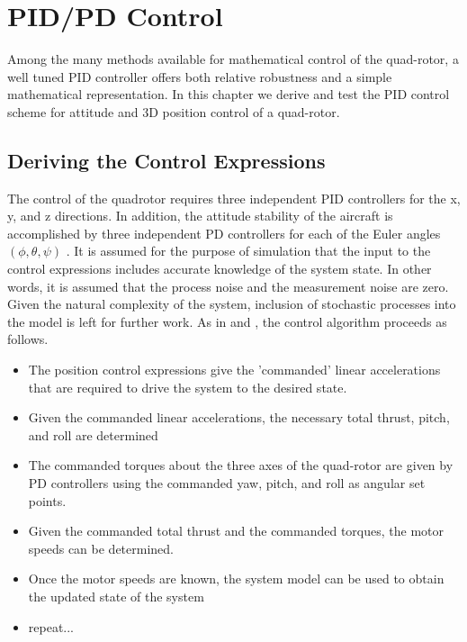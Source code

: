 
\chapter{PID/PD Control} %

\label{Chapter6} %


Among the many methods available for mathematical control of the quad-rotor, a well tuned PID controller offers both relative robustness and a simple mathematical representation. In this chapter we derive and test the PID control scheme for attitude and 3D position control of a quad-rotor.  






\section{Deriving the Control Expressions}

The control of the quadrotor requires three independent PID controllers for the x, y, and z directions. In addition, the attitude stability of the aircraft is accomplished by three independent PD controllers for each of the Euler angles $(\phi,\theta,\psi)$ . It is assumed for the purpose of simulation that the input to the control expressions includes accurate knowledge of the system state. In other words, it is assumed that the process noise and the measurement noise are zero. Given the natural complexity of the system, inclusion of stochastic processes into the model is left for further work. As in \cite{Luukkonen} and \cite{bouabdallah2004pid}, the control algorithm proceeds as follows.

\begin{itemize}
\item The position control expressions give the 'commanded' linear accelerations that are required to drive the system to the desired state.
\item Given the commanded linear accelerations, the necessary total thrust, pitch, and roll are determined
\item The commanded torques about the three axes of the quad-rotor are given by PD controllers using the commanded yaw, pitch, and roll as angular set points.
\item Given the commanded total thrust and the commanded torques, the motor speeds can be determined.
\item Once the motor speeds are known, the system model can be used to obtain the updated state of the system
\item repeat... 
\end{itemize}

